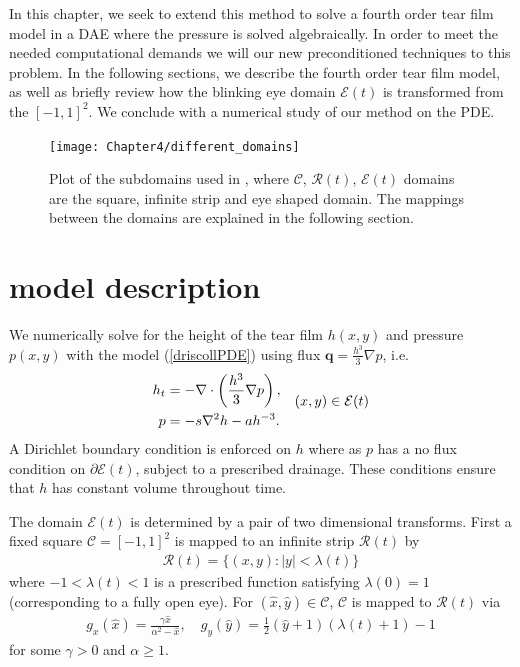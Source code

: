 In this chapter, we seek to extend this method to solve a fourth order tear film model in a DAE where the pressure is solved algebraically. In order to meet the needed computational demands we will our new preconditioned techniques to this problem. In the following sections, we describe the fourth order tear film model, as well as briefly review how the blinking eye domain $\mathcal{E}(t)$ is transformed from the $[-1,1]^2$. We conclude with a numerical study of our method on the PDE.


\begin{figure}
  \centering
  \texttt{[image: Chapter4/different\_domains]}
  \caption{Plot of the subdomains used in \cite{driscoll2018simulation}, where $\mathcal{C}$, $\mathcal{R}(t)$, $\mathcal{E}(t)$ domains are the square, infinite strip and eye shaped domain. The mappings between the domains are explained in the following section.}
  \label{driscoll_eye}
\end{figure}
	
\section{model description}

We numerically solve for the height of the tear film $h(x,y)$ and pressure $p(x,y)$ with the model (\ref{driscollPDE}) using flux $\bm{q} =  \frac{h^3}{3} \nabla p$, i.e.
\begin{align}
\begin{aligned}
h_t &= - \nabla \cdot \left( \frac{h^3}{3} \nabla p \right), \\
p &= - s \nabla^2 h - a h^{-3}.
\end{aligned} \quad (x,y) \in \mathcal{E}(t)
\label{the_pde}
\end{align}
A Dirichlet boundary condition is enforced on $h$ where as $p$ has a no flux condition on $\partial \mathcal{E}(t)$, subject to a prescribed drainage. These conditions ensure that $h$ has constant volume throughout time.

The domain $\mathcal{E}(t)$ is determined by a pair of two dimensional transforms. First a fixed square $\mathcal{C}=[-1,1]^2$ is mapped to an infinite strip $\mathcal{R}(t)$ by
\begin{align}
\mathcal{R}(t) = \{(x,y):|y|<\lambda(t)\}	
\end{align}
where $-1<\lambda(t)<1$ is a prescribed function satisfying $\lambda(0)=1$ (corresponding to a fully open eye). For $(\hat{x},\hat{y}) \in \mathcal{C}$, $\mathcal{C}$ is mapped to $\mathcal{R}(t)$ via
\begin{align}
	g_x(\hat{x}) = \frac{\gamma \hat{x}}{\alpha^2 - \hat{x}}, \quad g_y(\hat{y}) = \frac{1}{2} (\hat{y}+1)(\lambda(t)+1)-1
\end{align}
for some $\gamma>0$ and $\alpha \geq 1$.


